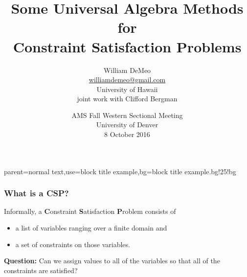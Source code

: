 \documentclass[10pt,xcolor=dvipsnames%
   ]{beamer}
\DeclareMathOperator{\Rel}{Rel}
\renewcommand{\.}{\cdot}
\newcommand{\sP}{\ensuremath{\mathcal{P}}}
\begin{document}
\title[Algebraic CSP]{Some Universal Algebra Methods for \\Constraint Satisfaction Problems}
\author[\url{williamdemeo@gmail.com}]{William DeMeo\\
  {\small \url{williamdemeo@gmail.com}}\\[5pt]
  {\small University of Hawaii}\\[10pt]
  {\small joint work with Clifford Bergman}
}

\date[8 Oct 2016]{AMS Fall Western Sectional Meeting\\[10pt]
University of Denver\\[10pt]
8 October 2016}

\frame[plain]{\titlepage}

%
{parent=normal text,use=block title example,bg=block title example.bg!25!bg}

\begin{frame}
\frametitle{What is a CSP?}

  Informally, a \textbf{C}onstraint \textbf Satisfaction \textbf Problem
  consists of
  \begin{itemize}
  \item a list of variables ranging over a finite domain and
  \item a set of constraints on those variables.
  \end{itemize}

  \textbf{Question:}
  Can we assign values to all of the variables so that
  all of the constraints are satisfied?

\end{frame}







\end{document}
